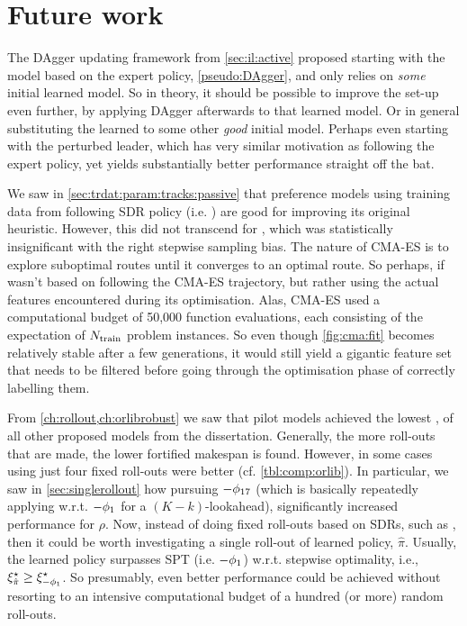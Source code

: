 \section{Future work}

The DAgger updating framework from \cref{sec:il:active} proposed starting with 
the model based on the expert policy, \cref{pseudo:DAgger}, and only relies on 
\emph{some} initial learned model. So in theory, it should be possible to 
improve the  set-up even further, by applying DAgger 
afterwards to that learned model. Or in general substituting the learned 
 to some other \emph{good} initial model.
Perhaps even starting with the perturbed leader, which has very similar 
motivation as following the expert policy, yet yields substantially better 
performance straight off the bat.

We saw in \cref{sec:trdat:param:tracks:passive} that preference models using 
training data from following SDR policy (i.e. \PhiSet{\SDR}) are good for 
improving its original heuristic. However, this did not transcend for 
\PhiSet{\CMAES}, which was statistically insignificant with the right stepwise 
sampling bias.
The nature of CMA-ES is to explore suboptimal routes until it converges to an 
optimal route. So perhaps, if \PhiSet{\CMAES} wasn't based on following the 
CMA-ES trajectory, but rather using the actual features encountered during its 
optimisation. 
Alas, CMA-ES used a computational budget of 50,000 function evaluations, each 
consisting of the expectation of $N_{\text{train}}$ problem instances. 
So even though \cref{fig:cma:fit} becomes relatively stable after a few 
generations, it would still yield a gigantic feature set that needs to be 
filtered before going through the optimisation phase of correctly labelling 
them.

From \cref{ch:rollout,ch:orlibrobust} we saw that pilot models achieved the 
lowest \namerho, of all other proposed models from the dissertation. 
Generally, the more roll-outs that are made, the lower fortified makespan is 
found. However, in some cases using just four fixed roll-outs were better (cf. 
\cref{tbl:comp:orlib}). 
In particular, we saw in \cref{sec:singlerollout} how pursuing $-\phi_{17}$ 
(which is basically repeatedly applying w.r.t. $-\phi_1$ for a 
$(K-k)$-lookahead), significantly increased performance for $\rho$.
Now, instead of doing fixed roll-outs based on SDRs, such as \phiSDRRelated, 
then it could be worth investigating a single roll-out of learned policy, 
$\hat{\pi}$. 
Usually, the learned policy surpasses SPT (i.e. $-\phi_1$) w.r.t. stepwise 
optimality, i.e., $\xi^{\star}_{\hat{\pi}}\geq\xi^{\star}_{-\phi_1}$. 
So presumably, even better performance could be achieved without resorting 
to an intensive computational budget of a hundred (or more) random roll-outs.

